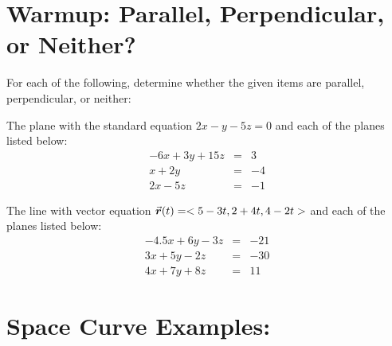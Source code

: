 \section*{Warmup: Parallel, Perpendicular, or Neither?}
For each of the following, determine whether the given items are parallel, perpendicular, or neither:


\begin{list}{\bf{Warmup : }}{}

%
%
%
%
%
%
\item The plane with the standard equation \(2x-y-5z = 0\) and each of the planes listed below:
\begin{eqnarray*}
-6x + 3y + 15z &=& 3\\
x+2y &=& -4\\
2x - 5z &=& -1
\end{eqnarray*}

\vfill


\item The line with vector equation \(\r(t) = <5-3t, 2+4t, 4-2t>\) and each of the planes listed below:
\begin{eqnarray*}
-4.5x+6y-3z &=& -21\\
3x + 5y - 2z &=& -30\\
4x + 7y + 8z &=& 11
\end{eqnarray*}
%




\end{list}

\pagebreak

\section*{Space Curve Examples:}


